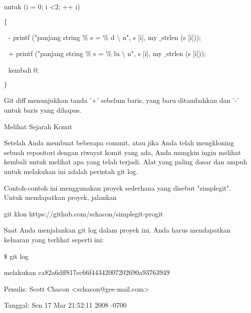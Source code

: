 \noindent 
 \hspace*{0.5in} untuk (i = 0; i <2; ++ i) \par
\noindent 
 \hspace*{0.5in}  $  \{  $ \par
\noindent 
 \hspace*{0.5in}  $  $ $  $ $  $- printf ("panjang string $  \%  $ s = $  \%  $ d  $  \setminus  $ n", s [i], my $  \_  $strlen (s [i])); \par
\noindent 
 \hspace*{0.5in}  $  $ $  $ $  $+ printf ("panjang string $  \%  $ s = $  \%  $ lu  $  \setminus  $ n", s [i], my $  \_  $strlen (s [i])); \par
\noindent 
 \hspace*{0.5in}  $  $ $  $ $  $kembali 0; \par
\noindent 
 \hspace*{0.5in}  $  \}  $ \par
\noindent 
Git diff menunjukkan tanda '+' sebelum baris, yang baru ditambahkan dan '-' untuk baris yang dihapus. \par
\noindent 
Melihat Sejarah Komit \par
\noindent 
 \hspace*{0.5in} Setelah Anda membuat beberapa commit, atau jika Anda telah mengkloning sebuah repositori dengan riwayat komit yang ada, Anda mungkin ingin melihat kembali untuk melihat apa yang telah terjadi. Alat yang paling dasar dan ampuh untuk melakukan ini adalah perintah git log. \par
\noindent 
Contoh-contoh ini menggunakan proyek sederhana yang disebut "simplegit". Untuk mendapatkan proyek, jalankan \par
\noindent 
git klon https://github.com/schacon/simplegit-progit \par
\noindent 
Saat Anda menjalankan git log dalam proyek ini, Anda harus mendapatkan keluaran yang terlihat seperti ini: \par
\noindent 
 \hspace*{0.5in}  $  \$  $ git log \par
\noindent 
 \hspace*{0.5in} melakukan ca82a6dff817ec66f44342007202690a93763949 \par
\noindent 
 \hspace*{0.5in} Penulis: Scott Chacon <schacon@gee-mail.com> \par
\noindent 
 \hspace*{0.5in} Tanggal: Sen 17 Mar 21:52:11 2008 -0700 \par
